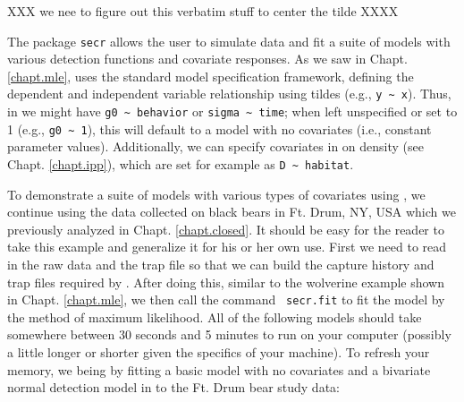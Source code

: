 XXX we nee to figure out this verbatim stuff to center the tilde XXXX

The package \mbox{\tt secr} allows the user to simulate data and fit a
suite of models with various detection functions and covariate
responses.  As we saw in Chapt. \ref{chapt.mle}, \secr uses the standard \R model
specification framework, defining the dependent and independent
variable relationship using tildes
(e.g., \Verb+y ~ x+).
Thus, in \secr we
might have \verb+g0 ~ behavior+ or \verb+sigma ~ time+; 
when left unspecified or set
to 1 (e.g., \verb+g0 ~ 1+), this will default to a model with no
covariates
(i.e., constant parameter values).
Additionally, we can specify covariates in \secr
on density (see Chapt. \ref{chapt.ipp}), 
which are set for example as \verb+D ~ habitat+.  

To demonstrate
a suite of models with various types of covariates using \secr, we
continue using the data collected on black bears in Ft. Drum, NY, USA
which we previously analyzed in Chapt. \ref{chapt.closed}.
It should be easy for the reader to take this example and generalize
it for his or her own use.  First we need to read in the raw data and
the trap file so that we can build the capture history and trap files
required by \secr.  After doing this, similar to the wolverine example
shown in Chapt. \ref{chapt.mle}, we then call the command \mbox{\tt
  secr.fit} 
to fit the model by the method of maximum likelihood.
 All of the following models should take somewhere between 30
seconds and 5 minutes to run on your computer (possibly a little
longer or shorter given the specifics of your machine).  To refresh
your memory, we being by fitting a basic 
model with no covariates and a bivariate normal detection model in
\secr to the Ft. Drum bear study data: 

